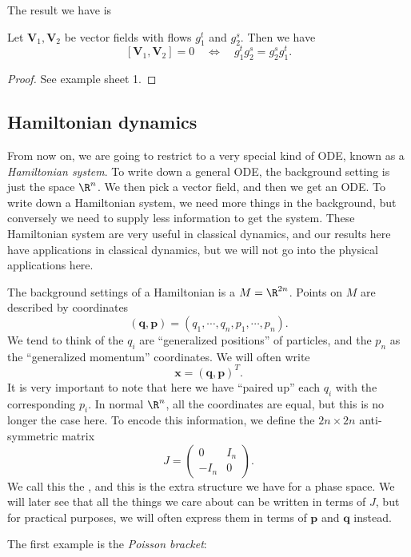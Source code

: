 \documentclass[a4paper]{article}
\begin{document}
The result we have is
\begin{prop}
  Let $\mathbf{V}_1, \mathbf{V}_2$ be vector fields with flows $g_1^t$ and $g_2^s$. Then we have
  \[
    [\mathbf{V}_1, \mathbf{V}_2] = 0 \quad\Longleftrightarrow\quad g_1^t g_2^s = g_2^s g_1^t.
  \]
\end{prop}

\begin{proof}
  See example sheet 1.
\end{proof}

\subsection{Hamiltonian dynamics}
From now on, we are going to restrict to a very special kind of ODE, known as a \emph{Hamiltonian system}. To write down a general ODE, the background setting is just the space $\R^n$. We then pick a vector field, and then we get an ODE. To write down a Hamiltonian system, we need more things in the background, but conversely we need to supply less information to get the system. These Hamiltonian system are very useful in classical dynamics, and our results here have applications in classical dynamics, but we will not go into the physical applications here.

The background settings of a Hamiltonian is a  $M = \R^{2n}$. Points on $M$ are described by coordinates
\[
  (\mathbf{q}, \mathbf{p}) = (q_1, \cdots, q_n, p_1, \cdots, p_n).
\]
We tend to think of the $q_i$ are ``generalized positions'' of particles, and the $p_n$ as the ``generalized momentum'' coordinates. We will often write
\[
  \mathbf{x} = (\mathbf{q}, \mathbf{p})^T.
\]
It is very important to note that here we have ``paired up'' each $q_i$ with the corresponding $p_i$. In normal $\R^n$, all the coordinates are equal, but this is no longer the case here. To encode this information, we define the $2n \times 2n$ anti-symmetric matrix
\[
  J =
  \begin{pmatrix}
    0 & I_n\\
    -I_n & 0
  \end{pmatrix}.
\]
We call this the , and this is the extra structure we have for a phase space. We will later see that all the things we care about can be written in terms of $J$, but for practical purposes, we will often express them in terms of $\mathbf{p}$ and $\mathbf{q}$ instead.

The first example is the \emph{Poisson bracket}:
\end{document}
